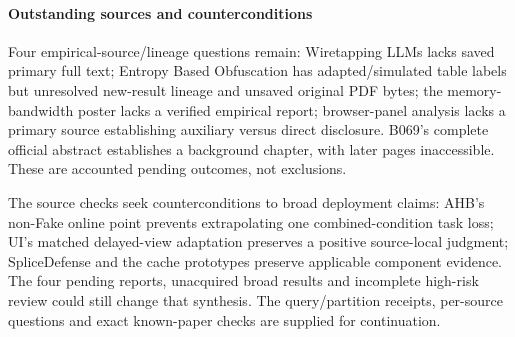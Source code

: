 \paragraph{Outstanding sources and counterconditions}
Four empirical-source/lineage questions remain: Wiretapping LLMs lacks saved primary full text; Entropy Based Obfuscation has adapted/simulated table labels but unresolved new-result lineage and unsaved original PDF bytes; the memory-bandwidth poster lacks a verified empirical report; browser-panel analysis lacks a primary source establishing auxiliary versus direct disclosure. B069's complete official abstract establishes a background chapter, with later pages inaccessible. These are accounted pending outcomes, not exclusions.

The source checks seek counterconditions to broad deployment claims: AHB's non-Fake online point prevents extrapolating one combined-condition task loss; UI's matched delayed-view adaptation preserves a positive source-local judgment; SpliceDefense and the cache prototypes preserve applicable component evidence. The four pending reports, unacquired broad results and incomplete high-risk review could still change that synthesis. The query/partition receipts, per-source questions and exact known-paper checks are supplied for continuation.

